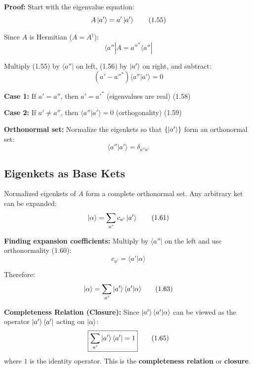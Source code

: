 \documentclass[11pt,a4paper]{article}
\begin{document}
\textbf{Proof:}
Start with the eigenvalue equation:
\begin{equation}
A\ket{a'} = a'\ket{a'}
\tag{1.55}
\end{equation}

Since $A$ is Hermitian ($A = A^\dagger$):
\begin{equation}
\langle a''|A = a''^*\langle a''|
\tag{1.56}
\end{equation}

Multiply (1.55) by $\langle a''|$ on left, (1.56) by $\ket{a'}$ on right, and subtract:
\begin{equation}
(a' - a''^*)\langle a''|a'\rangle = 0
\tag{1.57}
\end{equation}

\textbf{Case 1:} If $a' = a''$, then $a' = a'^*$ (eigenvalues are real) \hfill (1.58)

\textbf{Case 2:} If $a' \neq a''$, then $\langle a''|a'\rangle = 0$ (orthogonality) \hfill (1.59)

\textbf{Orthonormal set:} Normalize the eigenkets so that $\{\ket{a'}\}$ form an orthonormal set:
\begin{equation}
\langle a''|a'\rangle = \delta_{a''a'}
\tag{1.60}
\end{equation}

\subsection{Eigenkets as Base Kets}

Normalized eigenkets of $A$ form a complete orthonormal set. Any arbitrary ket can be expanded:
\begin{equation}
\ket{\alpha} = \sum_{a'} c_{a'}\ket{a'}
\tag{1.61}
\end{equation}

\textbf{Finding expansion coefficients:}
Multiply by $\langle a''|$ on the left and use orthonormality (1.60):
\begin{equation}
c_{a'} = \langle a'|\alpha\rangle
\tag{1.62}
\end{equation}

Therefore:
\begin{equation}
\ket{\alpha} = \sum_{a'}\ket{a'}\langle a'|\alpha\rangle
\tag{1.63}
\end{equation}

\textbf{Completeness Relation (Closure):}
Since $\ket{a'}\langle a'|\alpha\rangle$ can be viewed as the operator $\ket{a'}\langle a'|$ acting on $\ket{\alpha}$:
\begin{equation}
\boxed{\sum_{a'}\ket{a'}\langle a'| = 1}
\tag{1.65}
\end{equation}
where $1$ is the identity operator. This is the \textbf{completeness relation} or \textbf{closure}.
\end{document}
